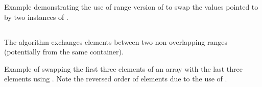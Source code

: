\begin{box-note}
\footnotesize Example demonstrating the use of range version of  to swap the values pointed to by two instances of .
\tcblower
{}
\end{box-note}

\subsection{\texorpdfstring{}{\texttt{std::swap\_ranges}}}

The  algorithm exchanges elements between two non-overlapping ranges (potentially from the same container).



\begin{box-note}
\footnotesize Example of swapping the first three elements of an array with the last three elements using . Note the reversed order of elements due to the use of .
\tcblower
{}
\end{box-note}